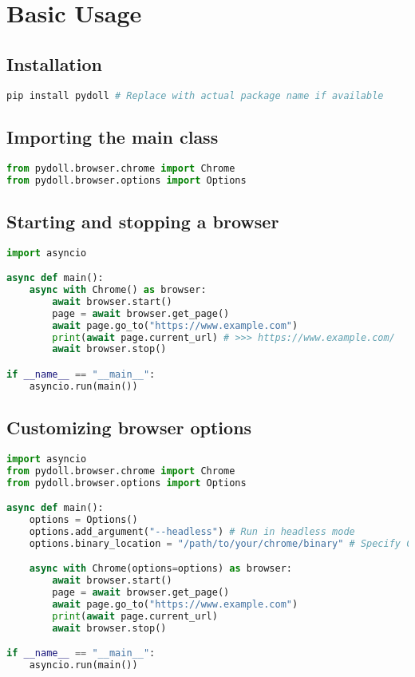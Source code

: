\documentclass{article}
\begin{document}
\section{Basic Usage}

\subsection{Installation}

\begin{lstlisting}[language=bash]
pip install pydoll # Replace with actual package name if available
\end{lstlisting}

\subsection{Importing the main class}

\begin{lstlisting}[language=Python]
from pydoll.browser.chrome import Chrome
from pydoll.browser.options import Options
\end{lstlisting}

\subsection{Starting and stopping a browser}

\begin{lstlisting}[language=Python]
import asyncio

async def main():
    async with Chrome() as browser:
        await browser.start()
        page = await browser.get_page()
        await page.go_to("https://www.example.com")
        print(await page.current_url) # >>> https://www.example.com/
        await browser.stop()

if __name__ == "__main__":
    asyncio.run(main())
\end{lstlisting}

\subsection{Customizing browser options}

\begin{lstlisting}[language=Python]
import asyncio
from pydoll.browser.chrome import Chrome
from pydoll.browser.options import Options

async def main():
    options = Options()
    options.add_argument("--headless") # Run in headless mode
    options.binary_location = "/path/to/your/chrome/binary" # Specify Chrome binary path

    async with Chrome(options=options) as browser:
        await browser.start()
        page = await browser.get_page()
        await page.go_to("https://www.example.com")
        print(await page.current_url)
        await browser.stop()

if __name__ == "__main__":
    asyncio.run(main())
\end{lstlisting}
\end{document}
